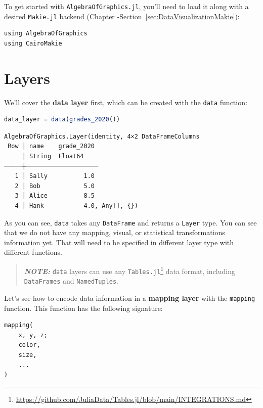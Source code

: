 \documentclass[
  notoc %
]{tufte-book}
\DeclareRobustCommand{\href}[2]{#2\footnote{\url{#1}}}
\newcommand{\passthrough}[1]{#1}
\begin{document}
To get started with \passthrough{\lstinline!AlgebraOfGraphics.jl!},
you'll need to load it along with a desired
\passthrough{\lstinline!Makie.jl!} backend (Chapter
-Section~\ref{sec:DataVisualizationMakie}):

\begin{lstlisting}
using AlgebraOfGraphics
using CairoMakie
\end{lstlisting}

\hypertarget{sec:aog_layers}{%
\section{Layers}\label{sec:aog_layers}}

We'll cover the \textbf{data layer} first, which can be created with the
\passthrough{\lstinline!data!} function:

\begin{lstlisting}[language=Julia]
data_layer = data(grades_2020())
\end{lstlisting}

\begin{lstlisting}[language=Output]
AlgebraOfGraphics.Layer(identity, 4×2 DataFrameColumns
 Row │ name    grade_2020
     │ String  Float64
─────┼────────────────────
   1 │ Sally          1.0
   2 │ Bob            5.0
   3 │ Alice          8.5
   4 │ Hank           4.0, Any[], {})
\end{lstlisting}

As you can see, \passthrough{\lstinline!data!} takes any
\passthrough{\lstinline!DataFrame!} and returns a
\passthrough{\lstinline!Layer!} type. You can see that we do not have
any mapping, visual, or statistical transformations information yet.
That will need to be specified in different layer type with different
functions.

\begin{quote}
\textbf{\emph{NOTE:}} \passthrough{\lstinline!data!} layers can use any
\href{https://github.com/JuliaData/Tables.jl/blob/main/INTEGRATIONS.md}{\passthrough{\lstinline!Tables.jl!}}
data format, including \passthrough{\lstinline!DataFrames!} and
\passthrough{\lstinline!NamedTuples!}.
\end{quote}

Let's see how to encode data information in a \textbf{mapping layer}
with the \passthrough{\lstinline!mapping!} function. This function has
the following signature:

\begin{lstlisting}
mapping(
    x, y, z;
    color,
    size,
    ...
)
\end{lstlisting}
\end{document}
